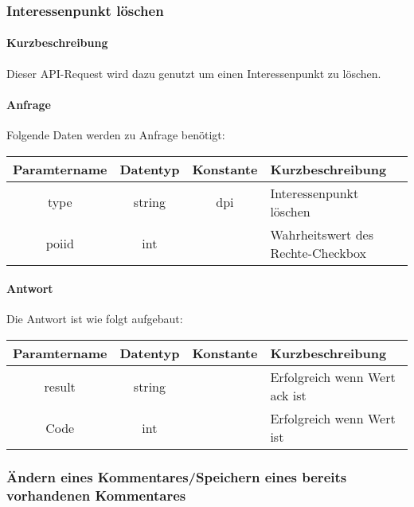 \subsubsection{Interessenpunkt löschen}
\paragraph{Kurzbeschreibung}Dieser API-Request wird dazu genutzt um einen Interessenpunkt zu löschen.
\paragraph{Anfrage}Folgende Daten werden zu Anfrage benötigt:
\begin{table}[H]
	\begin{tabular}{|c|c|c|p{6.5cm}|}
		\hline
		\textbf{Paramtername} & \textbf{Datentyp} & \textbf{Konstante} & \textbf{Kurzbeschreibung}                                                                                               \\ \hline
		type                & string            & dpi                & Interessenpunkt löschen \\ \hline
		poiid               & int               &                    & Wahrheitswert des Rechte-Checkbox \\ \hline
	\end{tabular}
\end{table}
\paragraph{Antwort}Die Antwort ist wie folgt aufgebaut:
\begin{table}[H]
	\begin{tabular}{|c|c|c|p{6.5cm}|}
		\hline
		\textbf{Paramtername} & \textbf{Datentyp} & \textbf{Konstante} & \textbf{Kurzbeschreibung}                                                                                               \\ \hline
		result              & string           &                 & Erfolgreich wenn Wert {\glqq ack\grqq} ist \\ \hline
		Code                & int              &                 & Erfolgreich wenn Wert {\glqq 0\grqq} ist \\ \hline
	\end{tabular}
\end{table}
\subsubsection{Ändern eines Kommentares/Speichern eines bereits vorhandenen Kommentares}
